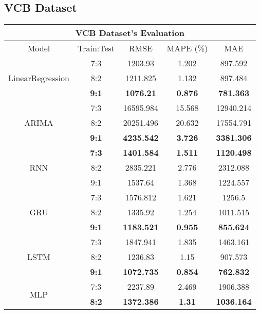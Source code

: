 \documentclass{ieeeojies}
\begin{document}
\subsection{VCB Dataset} 
\begin{table}[H]
    \centering
    \renewcommand{\arraystretch}{1.1}
    \begin{tabular}{|c|c|c|c|c|}
         \hline
         \multicolumn{5}{|c|}{\textbf{VCB Dataset's Evaluation}}\\
         \hline
         \centering Model & Train:Test & RMSE & MAPE (\%) & MAE\\
         \hline
         \multirow{3}{*}{LinearRegression} 
         & 7:3 & 1203.93 & 1.202 & 897.592 \\ 
         & 8:2 & 1211.825 & 1.132 & 897.484 \\ 
         & \textbf{9:1} & \textbf{1076.21} & \textbf{0.876} & \textbf{781.363}\\
         \hline
         \multirow{3}{*}{ARIMA} 
         & 7:3 & 16595.984 & 15.568 & 12940.214\\ 
         & 8:2 & 20251.496 & 20.632 & 17554.791 \\ 
         & \textbf{9:1} & \textbf{4235.542} & \textbf{3.726} & \textbf{3381.306}\\
         \hline
         \multirow{3}{*}{RNN} 
         & \textbf{7:3} & \textbf{1401.584} & \textbf{1.511} & \textbf{1120.498} \\ 
         & 8:2 & 2835.221 & 2.776 & 2312.088 \\ 
         & 9:1 & 1537.64  & 1.368 & 1224.557\\
         \hline
         \multirow{3}{*}{GRU} 
         & 7:3 & 1576.812 & 1.621 & 1256.5 \\ 
         & 8:2 & 1335.92 & 1.254 & 1011.515 \\ 
         & \textbf{9:1} & \textbf{1183.521} & \textbf{0.955} & \textbf{855.624}\\
         \hline
         \multirow{3}{*}{LSTM} 
         & 7:3 & 1847.941 & 1.835 & 1463.161 \\ 
         & 8:2 & 1236.83 & 1.15 & 907.573 \\ 
         & \textbf{9:1} & \textbf{1072.735} & \textbf{0.854} & \textbf{762.832}\\
         \hline
         \multirow{3}{*}{MLP} 
         & 7:3 & 2237.89 & 2.469 & 1906.388 \\ 
         & \textbf{8:2} & \textbf{1372.386} & \textbf{1.31} & \textbf{1036.164} \\ 

\end{tabular}
\end{table}
\end{document}
